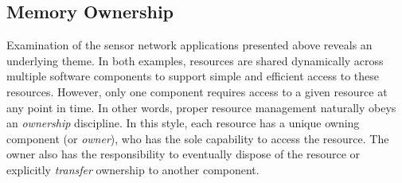 





\subsection{Memory Ownership}

Examination of the sensor network applications 
presented above reveals an underlying
theme.  In both examples, resources are shared dynamically across multiple
software components to support simple and efficient access to these
resources.  However, only one component requires access to a given
resource at any point in time.  
In other words, proper resource management
naturally obeys an {\em ownership} discipline.  In this
style, each resource has a unique owning component (or {\em owner}), 
who has the sole
capability to access the resource.  The owner also has the responsibility to
eventually dispose of the resource or explicitly {\em transfer} 
ownership to another
component.

